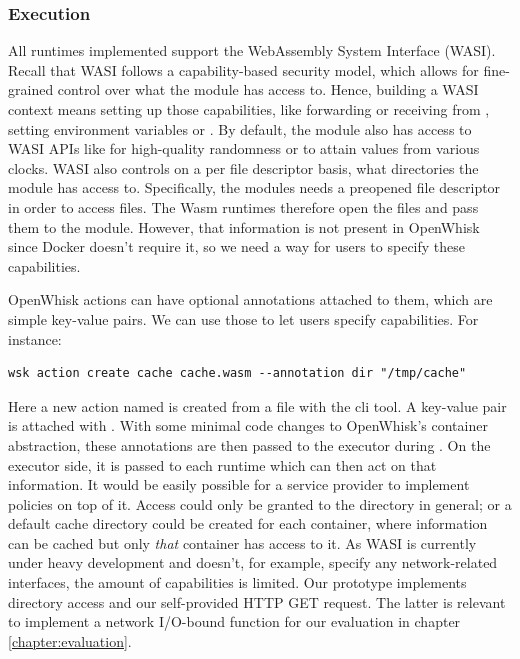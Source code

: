 \subsubsection{Execution}

All runtimes implemented support the WebAssembly System Interface (WASI). Recall that WASI follows a capability-based security model, which allows for fine-grained control over what the module has access to. Hence, building a WASI context means setting up those capabilities, like forwarding  or receiving from , setting environment variables or . By default, the module also has access to WASI APIs like  for high-quality randomness or  to attain values from various clocks. WASI also controls on a per file descriptor basis, what directories the module has access to. Specifically, the modules needs a preopened file descriptor in order to access files. The Wasm runtimes therefore open the files and pass them to the module. However, that information is not present in OpenWhisk since Docker doesn't require it, so we need a way for users to specify these capabilities.

OpenWhisk actions can have optional annotations attached to them, which are simple key-value pairs. We can use those to let users specify capabilities. For instance:

\begin{verbatim}
wsk action create cache cache.wasm --annotation dir "/tmp/cache"
\end{verbatim}

Here a new action named  is created from a file  with the  cli tool. A key-value pair is attached with . With some minimal code changes to OpenWhisk's container abstraction, these annotations are then passed to the executor during . On the executor side, it is passed to each runtime which can then act on that information. It would be easily possible for a service provider to implement policies on top of it. Access could only be granted to the  directory in general; or a default cache directory  could be created for each container, where information can be cached but only \emph{that} container has access to it. As WASI is currently under heavy development and doesn't, for example, specify any network-related interfaces, the amount of capabilities is limited. Our prototype implements directory access and our self-provided HTTP GET request. The latter is relevant to implement a network I/O-bound function for our evaluation in chapter \ref{chapter:evaluation}.


